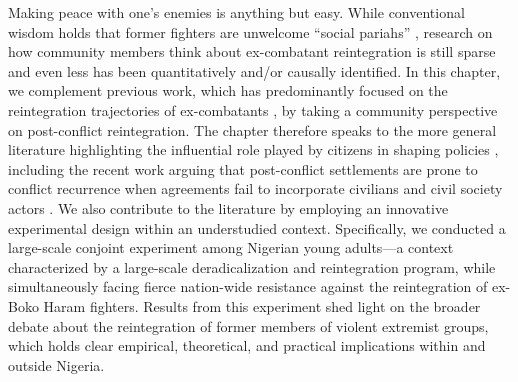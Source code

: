 Making peace with one's enemies is anything but easy. While conventional wisdom holds that former fighters are unwelcome ``social pariahs'' \citep[][p. 881]{Annan2011}, research on how community members think about ex-combatant reintegration is still sparse and even less has been quantitatively and/or causally identified. In this chapter, we complement previous work, which has predominantly focused on the reintegration trajectories of ex-combatants \citep[e.g.,][]{Blattman2016, Gilligan2012, UN2014}, by taking a community perspective on post-conflict reintegration. The chapter therefore speaks to the more general literature highlighting the influential role played by citizens in shaping policies \citep[e.g.,][]{Tomz2019}, including the recent work arguing that post-conflict settlements are prone to conflict recurrence when agreements fail to incorporate civilians and civil society actors \citep[e.g.,][]{Dyrstad2019, Tellez2019a}. We also contribute to the literature by employing an innovative experimental design within an understudied context. Specifically, we conducted a large-scale conjoint experiment among Nigerian young adults---a context characterized by a large-scale deradicalization and reintegration program, while simultaneously facing fierce nation-wide resistance against the reintegration of ex-Boko Haram fighters. Results from this experiment shed light on the broader debate about the reintegration of former members of violent extremist groups, which holds clear empirical, theoretical, and practical implications within and outside Nigeria.


